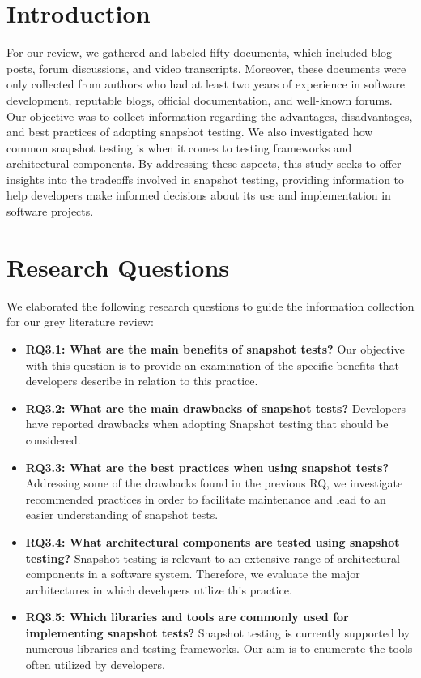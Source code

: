 \documentclass[
	msc, %
	english %
]{../ppgccufmg}
\begin{document}
        \section{Introduction}\label{sec:ch3-intro}

        For our review, we gathered and labeled fifty documents, which included blog posts, forum discussions, and video transcripts. Moreover, these documents were only collected from authors who had at least two years of experience in software development, reputable blogs, official documentation, and well-known forums. Our objective was to collect information regarding the advantages, disadvantages, and best practices of adopting snapshot testing. We also investigated how common snapshot testing is when it comes to testing frameworks and architectural components. By addressing these aspects, this study seeks to offer insights into the tradeoffs involved in snapshot testing, providing information to help developers make informed decisions about its use and implementation in software projects.

        \section{Research Questions}\label{sec:ch3-rqs}

        We elaborated the following research questions to guide the information collection for our grey literature review:\\

        \begin{itemize}
          \item \textbf{RQ3.1: What are the main benefits of snapshot tests?}
            Our objective with this question is to provide an examination of the specific benefits that developers describe in relation to this practice.
         \item \textbf{RQ3.2: What are the main drawbacks of snapshot tests?} 
            Developers have reported drawbacks when adopting Snapshot testing that should be considered.
         \item \textbf{RQ3.3: What are the best practices when using snapshot tests?}
            Addressing some of the drawbacks found in the previous RQ, we investigate recommended practices in order to facilitate maintenance and lead to an easier understanding of snapshot tests.
            \item \textbf{RQ3.4: What architectural components are tested using snapshot testing?}
            Snapshot testing is relevant to an extensive range of architectural components in a software system. Therefore, we evaluate the major architectures in which developers utilize this practice.
            \item \textbf{RQ3.5: Which libraries and tools are commonly used for implementing snapshot tests?}
            Snapshot testing is currently supported by numerous libraries and testing frameworks. Our aim is to enumerate the tools often utilized by developers.
        \end{itemize}
     
\end{document}
